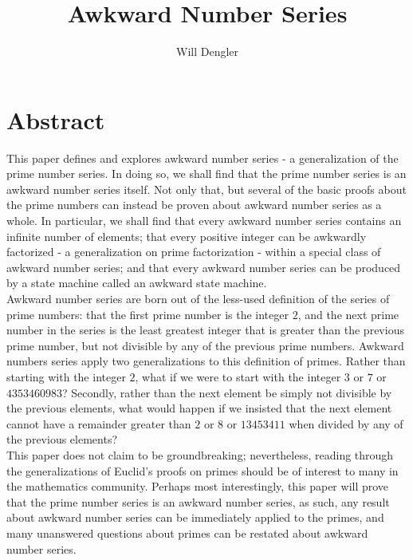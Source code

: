 \documentclass[a4paper,12pt]{article}
\begin{document}
\title{Awkward Number Series}
\author{Will Dengler}
\maketitle


\section{Abstract}
\label{section:abstract}


\noindent This paper defines and explores awkward number series - a generalization of the prime number series. In doing so, we shall find that the prime number series is an awkward number series itself. Not only that, but several of the basic proofs about the prime numbers can instead be proven about awkward number series as a whole. In particular, we shall find that every awkward number series contains an infinite number of elements; that every positive integer can be awkwardly factorized - a generalization on prime factorization - within a special class of awkward number series; and that every awkward number series can be produced by a state machine called an awkward state machine.\\

\noindent Awkward number series are born out of the less-used definition of the series of prime numbers: that the first prime number is the integer $2$, and the next prime number in the series is the least greatest integer that is greater than the previous prime number, but not divisible by any of the previous prime numbers. Awkward numbers series apply two generalizations to this definition of primes. Rather than starting with the integer $2$, what if we were to start with the integer $3$ or $7$ or $4353460983$? Secondly, rather than the next element be simply not divisible by the previous elements, what would happen if we insisted that the next element cannot have a remainder greater than $2$ or $8$ or $13453411$ when divided by any of the previous elements?\\

\noindent This paper does not claim to be groundbreaking; nevertheless, reading through the generalizations of Euclid's proofs on primes should be of interest to many in the mathematics community. Perhaps most interestingly, this paper will prove that the prime number series is an awkward number series, as such, any result about awkward number series can be immediately applied to the primes, and many unanswered questions about primes can be restated about awkward number series.
\end{document}
